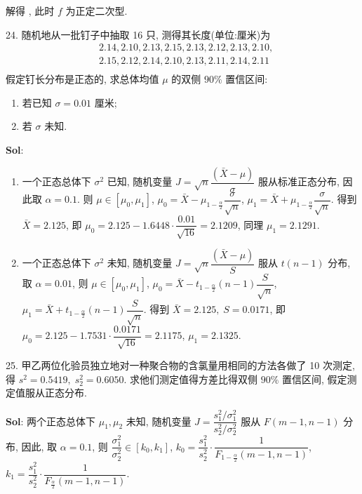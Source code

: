 解得 , 此时 $f$ 为正定二次型.


\vspace{12pt}

24. 随机地从一批钉子中抽取 16 只, 测得其长度(单位:厘米)为
$$
\begin{aligned}
&2.14,2.10,2.13,2.15,2.13,2.12,2.13,2.10,\\
&2.15,2.12,2.14,2.10,2.13,2.11,2.14,2.11\\
\end{aligned}
$$
假定钉长分布是正态的, 求总体均值 $\mu$ 的双侧 $90\%$ 置信区间:
\begin{enumerate}[(1)]
    \item 若已知 $\sigma=0.01$ 厘米;
    \item 若 $\sigma$ 未知.
\end{enumerate}

\textbf{Sol}: 

\begin{enumerate}[(1)]
    \item 一个正态总体下 $\sigma^2$ 已知, 随机变量 $J=\sqrt{n}\dfrac{(\bar{X}-\mu)}{\sigma}$ 服从标准正态分布, 因此取 $\alpha=0.1$. 则 $\mu\in[\mu_0,\mu_1]$, $\mu_0=\bar{X}-\mu_{1-\frac{\alpha}{2}}\dfrac{\sigma}{\sqrt{n}}$, $\mu_1=\bar{X}+\mu_{1-\frac{\alpha}{2}}\dfrac{\sigma}{\sqrt{n}}$. 得到 $\bar{X}=2.125$, 即 $\mu_0=2.125-1.6448\cdot\dfrac{0.01}{\sqrt{16}}=2.1209$, 同理 $\mu_1=2.1291$. 
    \mybox{$[2.1209,2.1291]$}
    \item 一个正态总体下 $\sigma^2$ 未知, 随机变量 $J=\sqrt{n}\dfrac{(\bar{X}-\mu)}{S}$ 服从 $t(n-1)$ 分布, 取 $\alpha=0.01$, 则 $\mu\in[\mu_0,\mu_1]$, $\mu_0=\bar{X}-t_{1-\frac{\alpha}{2}}(n-1)\dfrac{S}{\sqrt{n}}$, $\mu_1=\bar{X}+t_{1-\frac{\alpha}{2}}(n-1)\dfrac{S}{\sqrt{n}}$. 得到 $\bar{X}=2.125,\;S=0.0171$, 即 $\mu_0=2.125-1.7531\cdot\dfrac{0.0171}{\sqrt{16}}=2.1175$, $\mu_1=2.1325$. 
    \mybox{$[2.1175,2.1325]$}
\end{enumerate}


\vspace{12pt}

25. 甲乙两位化验员独立地对一种聚合物的含氯量用相同的方法各做了 10 次测定, 得 $s^2=0.5419,\;s_2^2=0.6050$. 求他们测定值得方差比得双侧 $90\%$ 置信区间, 假定测定值服从正态分布.

\textbf{Sol}: 两个正态总体下 $\mu_1,\mu_2$ 未知, 随机变量 $J=\dfrac{s_1^2/\sigma_1^2}{s_2^2/\sigma_2^2}$ 服从 $F(m-1,n-1)$ 分布, 因此, 取 $\alpha=0.1$, 则 $\dfrac{\sigma_1^2}{\sigma_2^2}\in[k_0,k_1]$, $k_0=\dfrac{s_1^2}{s_2^2}\cdot\dfrac{1}{F_{1-\frac{\alpha}{2}}(m-1,n-1)}$, $k_1=\dfrac{s_1^2}{s_2^2}\cdot\dfrac{1}{F_{\frac{\alpha}{2}}(m-1,n-1)}$.

